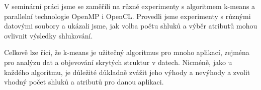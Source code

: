 \documentclass[czech,bachelor]{seminarka}
\begin{document}
V seminární práci jsme se zaměřili na různé experimenty s algoritmem k-means a parallelní technologie OpenMP i OpenCL. Provedli jsme experimenty s různými datovými soubory a ukázali jsme, jak volba počtu shluků a výběr atributů mohou ovlivnit výsledky shlukování.

Celkově lze říci, že k-means je užitečný algoritmus pro mnoho aplikací, zejména pro analýzu dat a objevování skrytých struktur v datech. Nicméně, jako u každého algoritmu, je důležité důkladně zvážit jeho výhody a nevýhody a zvolit vhodný počet shluků a atributů pro danou aplikaci.

\printbibliography[title={Seznam použité literatury}]
\end{document}
